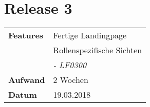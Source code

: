 
\section*{Release 3}
\label{sec:release_3}

\begin{tabular}{p{5cm} p{9cm}}
    \textbf{Features} & Fertige Landingpage \\
    & Rollenspezifische Sichten \\
    & \hspace{8pt} \textit{\footnotesize - LF0300} \\
    \hline
    \textbf{Aufwand} & 2 Wochen \\
    \hline
    \textbf{Datum} & 19.03.2018 \\
\end{tabular}
